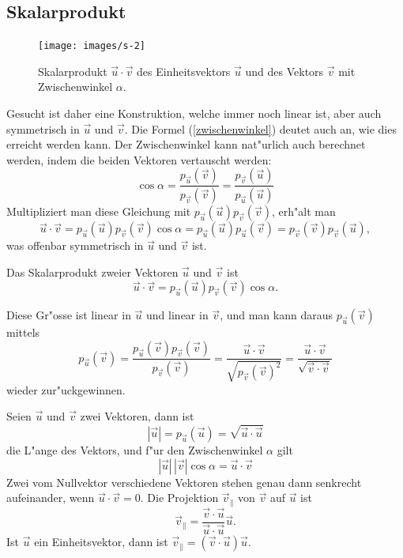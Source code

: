 \subsection{Skalarprodukt}
\begin{figure}
\begin{center}
\texttt{[image: images/s-2]}
\end{center}
\caption{Skalarprodukt $\vec u\cdot \vec v$ des Einheitsvektors $\vec u$
und des Vektors $\vec v$ mit Zwischenwinkel
$\alpha$.\label{image-skalarprodukt}}
\end{figure}
Gesucht ist daher eine Konstruktion, welche immer noch linear ist,
aber auch symmetrisch in $\vec u$ und $\vec v$.
Die Formel (\ref{zwischenwinkel}) deutet auch an, wie dies erreicht
werden kann. Der Zwischenwinkel kann nat"urlich auch berechnet werden,
indem die beiden Vektoren vertauscht werden:
\[
\cos \alpha
=
\frac{p_{\vec u}(\vec v)}{p_{\vec v}(\vec v)}
=
\frac{p_{\vec v}(\vec u)}{p_{\vec u}(\vec u)}
\]
Multipliziert man diese Gleichung mit 
$
p_{\vec u}(\vec u)
p_{\vec v}(\vec v)
$, erh"alt man
\[
\vec u\cdot\vec v
=
p_{\vec u}(\vec u)
p_{\vec v}(\vec v)
\cos\alpha =
p_{\vec u}(\vec u)p_{\vec u}(\vec v)
=
p_{\vec v}(\vec v)p_{\vec v}(\vec u),
\]
was offenbar symmetrisch in $\vec u$ und $\vec v$ ist.

\begin{definition}Das Skalarprodukt zweier Vektoren $\vec u$ und
$\vec v$ ist
\[
\vec u\cdot\vec v
=
p_{\vec u}(\vec u)
p_{\vec v}(\vec v)
\cos\alpha.
\]
\end{definition}
Diese Gr"osse ist linear in $\vec u$ und linear in $\vec v$, und man kann
daraus $p_{\vec u}(\vec v)$ mittels
\[
p_{\vec u}(\vec v)
=
\frac{p_{\vec u}(\vec v)p_{\vec v}(\vec v)}{p_{\vec v}(\vec v)}
=
\frac{\vec u\cdot\vec v}{\sqrt{p_{\vec v}(\vec v)^2}}
=
\frac{\vec u\cdot\vec v}{\sqrt{\vec v\cdot \vec v}}
\]
wieder zur"uckgewinnen.

\begin{satz}
Seien $\vec u$ und $\vec v$ zwei Vektoren, dann ist
\[
|\vec u|=p_{\vec u}(\vec u)=\sqrt{\vec u\cdot\vec u}
\]
die L"ange des Vektors, und f"ur den Zwischenwinkel $\alpha$ gilt
\[
|\vec u|\,|\vec v|\cos\alpha=\vec u\cdot\vec v
\]
Zwei vom Nullvektor verschiedene Vektoren  stehen genau dann senkrecht
aufeinander, wenn $\vec u\cdot\vec v=0$.
Die Projektion $\vec v_{\|}$ von $\vec v$ auf $\vec u$ ist
\[
\vec v_{\|}=\frac{\vec v\cdot\vec u}{\vec u\cdot\vec u}\vec u.
\]
Ist $\vec u$ ein Einheitsvektor, dann ist $\vec v_{\|}=(\vec v\cdot \vec u)\vec u$.
\end{satz}

